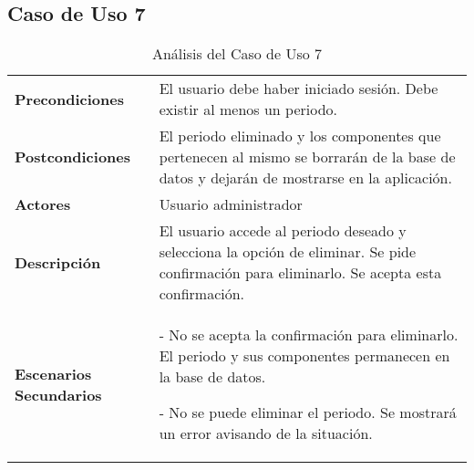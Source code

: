 \subsection{Caso de Uso 7}
\begin{table}[H]
  \centering
  \vspace{-5mm}
  \caption{Análisis del Caso de Uso 7}
    \begin{tabular}{p{7.5em}p{24.145em}}
    \toprule
    \rowcolor[rgb]{ .871,  .918,  .965} \multicolumn{2}{p{31.645em}}{\textbf{Eliminar periodo}} \\
    \midrule
    \rowcolor[rgb]{ .906,  .902,  .902} \textbf{Precondiciones} & \cellcolor[rgb]{ 1,  1,  1}El usuario debe haber iniciado sesión. Debe existir al menos un periodo. \\
    \midrule
    \rowcolor[rgb]{ .906,  .902,  .902} \textbf{Postcondiciones} & \cellcolor[rgb]{ 1,  1,  1}El periodo eliminado y los componentes que pertenecen al mismo se borrarán de la base de datos y dejarán de mostrarse en la aplicación. \\
    \midrule
    \rowcolor[rgb]{ .906,  .902,  .902} \textbf{Actores} & \cellcolor[rgb]{ 1,  1,  1}Usuario administrador \\
    \midrule
    \rowcolor[rgb]{ .906,  .902,  .902} \textbf{Descripción} & \cellcolor[rgb]{ 1,  1,  1}El usuario accede al periodo deseado y selecciona la opción de eliminar. Se pide confirmación para eliminarlo. Se acepta esta confirmación. \\
    \midrule
    \rowcolor[rgb]{ .906,  .902,  .902} \textbf{Escenarios          Secundarios} & \cellcolor[rgb]{ 1,  1,  1}- No se acepta la confirmación para eliminarlo. El periodo y sus componentes permanecen en la base de datos.\par - No se puede eliminar el periodo. Se mostrará un error avisando de la situación. \\
    \bottomrule
    \end{tabular}%
\end{table}%
 
